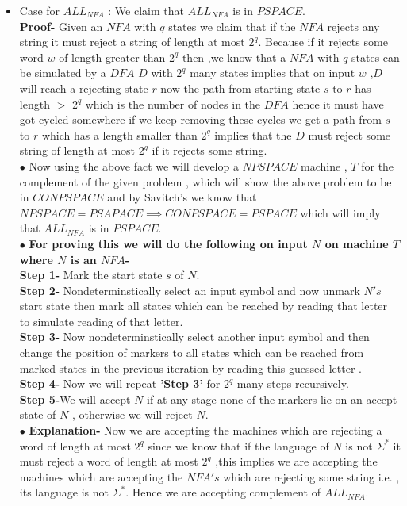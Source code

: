 \documentclass[a4paper, 11pt]{article}
\begin{document}
{\begin{itemize}
		The $DFS$ algorithm takes polynomial runtime on the graph of $D'$. And the conversion of $D$ to $D'$ takes also polynomial time. Hence $M$ takes polynomial time to decide $ALL_{DFA}$. Therefore $ALL_{DFA}\in P$
		\item Case for $ALL_{NFA} $ : We claim that $ALL_{NFA} $ is in $PSPACE$.\\
		\textbf{Proof-} Given an $NFA$ with $q$ states we claim that if the $NFA$ rejects any string it must reject a string of length at most $2^{q}$. Because if it rejects some word $w$ of length greater than $2^{q}$  then ,we know that a $NFA$ with $q$ states can be simulated by a $DFA$ $D$ with $2^{q}$ many states implies that on input $w$ ,$D$ will reach a rejecting state $r$ now the path from starting state $s$ to $r$ has length $>$ $2^{q}$ which is the number of nodes in the $DFA$ hence it must have got cycled somewhere if we keep removing these cycles we get a path from $s$ to $r$ which has a length smaller than $2^{q}$ implies that the $D$ must reject some string of length at most $2^{q}$ if it rejects some string.
		\\
		$\bullet$ Now using the above fact we will develop a $NPSPACE$ machine , $T$ for the complement of the given problem , which will show the above problem to be in $CONPSPACE$  and by Savitch's we know that $NPSPACE=PSAPACE\implies CONPSPACE=PSPACE$ which will imply that $ALL_{NFA}$ is in $PSPACE$. \\
		$\bullet$ \textbf{For proving this we will do the following on input $N$ on machine $T$ where $N$ is an $NFA$-}
		\\
		\textbf{Step 1-} Mark the start state $s$ of $N$.\\
		\textbf{Step 2-} Nondeterminstically select an input symbol and now unmark $N's$ start state then mark all states which can be reached by reading that letter to  simulate reading of that letter.\\
		\textbf{Step 3-} Now nondeterminstically  select another input symbol and then change the position of markers to all states which can be reached from marked states in the previous iteration by reading this guessed letter .\\
		\textbf{Step 4-} Now we will repeat \textbf{'Step 3'} for $2^{q}$ many steps recursively.\\
		\textbf{Step 5-}We will accept $N$ if at any stage none of the markers lie on an accept state of $N$ , otherwise we will reject $N$.\\
		$\bullet$ \textbf{Explanation-} Now we are accepting the machines which are rejecting a word of length at most $2^{q}$ since we know that if the language of $N$ is not $\Sigma^{*}$ it must reject a word of length at most $2^{q}$ ,this implies we are accepting the machines which are accepting the $NFA's$ which are rejecting some string i.e. , its language is not $\Sigma^{*}$. Hence we are accepting complement of $ALL_{NFA}$.\\

\end{itemize}}
\end{document}
